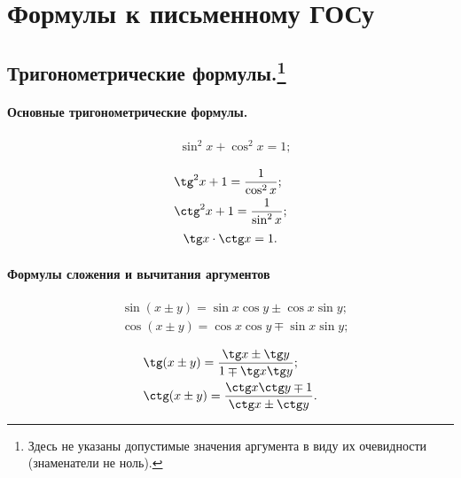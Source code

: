 \chapter{Формулы к письменному ГОСу}

\section[Тригонометрические формулы.]{Тригонометрические формулы.\footnote{Здесь не указаны допустимые значения аргумента в виду их очевидности (знаменатели не ноль).}}
\subsubsection{Основные тригонометрические формулы.}
\vspace*{-1.8\baselineskip}
\begin{multicols}{3}
\begin{align*}
&\sin^2x+\cos^2x=1;\\
\end{align*}
\vfill
\columnbreak
\begin{align*}
&\tg^2x+1=\frac{1}{\cos^2x};\\
&\ctg^2x+1=\frac{1}{\sin^2x};
\end{align*}
\vfill
\columnbreak
\begin{align*}
&\tg x\cdot\ctg x=1.\\
\end{align*}
\vfill
\end{multicols}
\subsubsection{Формулы сложения и вычитания аргументов}
\vspace*{-1.8\baselineskip}
\begin{multicols}{2}
\begin{align*}
&\sin(x\pm y)=\sin x \cos y \pm \cos x \sin y;\\
&\cos(x\pm y)= \cos x \cos y \mp \sin x \sin y;\\
\end{align*}
\vfill
\columnbreak
\begin{align*}
&\tg(x\pm y)=\frac{\tg x \pm \tg y}{1 \mp \tg x\tg y};\\
&\ctg(x\pm y)=\frac{\ctg x\ctg y \mp 1}{\ctg x \pm \ctg y}.
\end{align*}
\end{multicols}
